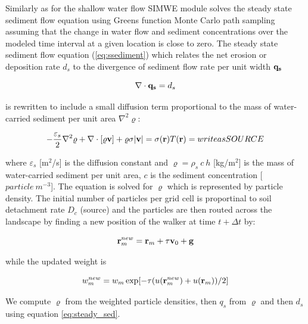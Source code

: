 \documentclass[gmd, manuscript]{copernicus}
\begin{document}
Similarly as for the shallow water flow SIMWE module solves the steady state sediment flow 
equation using Greens function Monte Carlo path sampling
assuming that the change in water flow
and sediment concentrations over the modeled time interval at a given location is close to zero.
The steady state sediment flow equation (\ref{eq:ssediment}) 
which relates the net erosion or deposition
rate $d_s$ to the divergence of sediment flow rate per unit width ${\bf q_s}$

\begin{equation}
\label{eq:steady_sed}
\nabla\cdot {\bf q_s} = d_s 
\end{equation}

is rewritten to include a small diffusion term proportional to the 
mass of water-carried sediment per unit area $\nabla^2 \varrho$:

\begin{equation}
\label{eq:difsedim}
-{\varepsilon_s \over 2}\nabla^2 \varrho
+ \nabla\cdot [\varrho {\bf v}]
 + \varrho \sigma |{\bf v}|
= \sigma({\bf r}) T({\bf r}) = write as SOURCE
\end{equation}

where  $\varepsilon_s$ [m$^2$/s] is the diffusion constant and
$\varrho = \rho_s~c~h$ [kg/m$^2$] is
the mass of water-carried sediment per unit area, $c$ is the sediment concentration [$\unit{particle~m^{-3}}$].
The equation is solved for $\varrho$ which is represented by particle density.
The initial number of particles per grid cell is proportinal to soil detachment rate $D_c$
(source) and the particles are then routed across the landscape by finding a new position 
of the walker at time $t + \Delta t$ by:

\begin{equation}
{\bf r}_m^{new}={\bf r}_m + \tau {\bf v}_0 + {\bf g}
\end{equation}

 while the updated weight is

\begin{equation}
w_m^{new}=w_m \exp[-\tau(u({\bf r}_m^{new})+u({\bf r}_m))/2]
\end{equation}

We compute $\varrho$ from the weighted particle densities, then $q_s$ from $\varrho$ 
and then $d_s$ using equation \ref{eq:steady_sed}.
\end{document}
